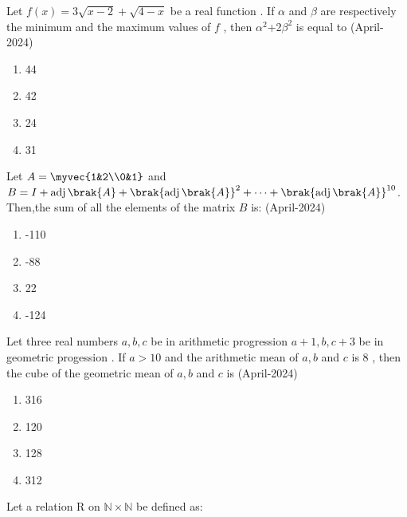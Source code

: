 \iffalse
  \title{Assignment}
  \author{EE24BTECH11041}
  \section{mcq-single}
\fi 


\item Let $f(x)=3\sqrt{x-2}+\sqrt{4-x}$ be a real function . If $\alpha$ and $\beta$ are respectively the minimum and the maximum values of $f$ , then $\alpha^2$+2$\beta^2$ is equal to
\hfill{(April-2024)}
\begin{multicols}{2}
\begin{enumerate}
\item 44
\item 42 
\item 24
\item 31
\end{enumerate}
\end{multicols}
\item Let $A=\myvec{1&2\\0&1}$ and $B=I+\operatorname{adj}\brak{A}+\brak{\operatorname{adj}\brak{A}}^2+\dots+\brak{\operatorname{adj}\brak{A}}^{10}$.\\
Then,the sum of all the elements of the matrix $B$ is:
\hfill{(April-2024)}
\begin{multicols}{2}
\begin{enumerate}
\item -110
\item -88 
\item 22
\item -124
\end{enumerate}
\end{multicols}
\item Let three real numbers $a,b,c$ be in arithmetic progression $a+1,b,c+3$ be in geometric progession . If $a>10$ and the arithmetic mean of $a,b$ and $c$ is 8 , then the cube of the geometric mean of $a,b$ and $c$ is
\hfill{(April-2024)}
\begin{multicols}{2}
\begin{enumerate}
\item 316
\item 120
\item 128
\item 312
\end{enumerate}
\end{multicols}
\item Let a relation R on $\mathbb{N} \times \mathbb{N}$ be defined as:\\

